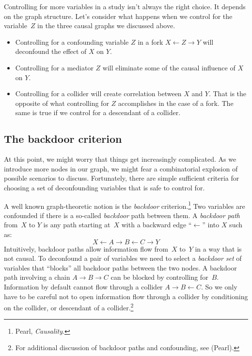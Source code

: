 \documentclass{tufte-book}
\begin{document}
Controlling for more variables in a study isn't always the right choice.
It depends on the graph structure. Let's consider what happens when we
control for the variable~\(Z\) in the three causal graphs we discussed
above.

\begin{itemize}
\tightlist
\item
  Controlling for a confounding variable \(Z\) in a fork
  \(X \leftarrow Z \rightarrow Y\) will deconfound the effect of \(X\)
  on \(Y\).
\item
  Controlling for a mediator \(Z\) will eliminate some of the causal
  influence of \(X\) on \(Y\).
\item
  Controlling for a collider will create correlation between \(X\) and
  \(Y\). That is the opposite of what controlling for \(Z\) accomplishes
  in the case of a fork. The same is true if we control for a descendant
  of a collider.
\end{itemize}

\hypertarget{the-backdoor-criterion}{%
\subsection{The backdoor criterion}\label{the-backdoor-criterion}}

At this point, we might worry that things get increasingly complicated.
As we introduce more nodes in our graph, we might fear a combinatorial
explosion of possible scenarios to discuss. Fortunately, there are
simple sufficient criteria for choosing a set of deconfounding variables
that is safe to control for.

A well known graph-theoretic notion is the
\emph{backdoor} criterion.\footnote{Pearl,
  \emph{Causality}.} Two variables are confounded if there is a
so-called \emph{backdoor} path between them. A \emph{backdoor path}
from~\(X\) to \(Y\) is any path starting at~\(X\) with a backward edge
``\(\leftarrow\)'' into \(X\) such as:
\[ X \leftarrow A \rightarrow B \leftarrow C \rightarrow Y \]
Intuitively, backdoor paths allow information flow from~\(X\) to~\(Y\)
in a way that is not causal. To deconfound a pair of variables we need
to select a \emph{backdoor set} of variables that ``blocks'' all
backdoor paths between the two nodes. A backdoor path involving a chain
\(A\rightarrow B\rightarrow C\) can be blocked by controlling for~\(B\).
Information by default cannot flow through a collider
\(A\rightarrow B\leftarrow C\). So we only have to be careful not to
open information flow through a collider by conditioning on the
collider, or descendant of a collider.\footnote{For additional
  discussion of backdoor paths and confounding, see (Pearl).}
\end{document}
